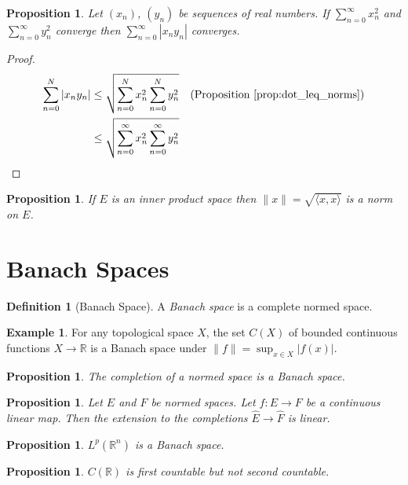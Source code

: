\documentclass{book}
\let\qed\relax
\newtheorem{prop}[ax]{Proposition}
\theoremstyle{definition}
\newtheorem{df}[ax]{Definition}
\newtheorem{ex}[ax]{Example}
\begin{document}
\begin{prop}
Let $(x_n)$, $(y_n)$ be sequences of real numbers. If $\sum_{n=0}^\infty x_n^2$ and $\sum_{n=0}^\infty y_n^2$ converge then $\sum_{n=0}^\infty |x_n y_n|$ converges.
\end{prop}

\begin{proof}
\pf
\begin{align*}
\sum_{n=0}^N |x_n y_n| & \leq \sqrt{\sum_{n=0}^N x_n^2 \sum_{n=0}^N y_n^2} & (\text{Proposition \ref{prop:dot_leq_norms}}) \\
& \leq \sqrt{\sum_{n=0}^\infty x_n^2 \sum_{n=0}^\infty y_n^2} & \qed
\end{align*}
\end{proof}


\begin{prop}
If $E$ is an inner product space then $\| x \| = \sqrt{\langle x,x \rangle}$ is a norm on $E$.
\end{prop}

\section{Banach Spaces}

\begin{df}[Banach Space]
A \emph{Banach space} is a complete normed space.
\end{df}

\begin{ex}
For any topological space $X$, the set $C(X)$ of bounded continuous functions $X \rightarrow \mathbb{R}$ is a Banach space under $\| f \| = \sup_{x \in X} |f(x)|$.
\end{ex}

\begin{prop}
The completion of a normed space is a Banach space.
\end{prop}

\begin{prop}
Let $E$ and $F$ be normed spaces. Let $f : E \rightarrow F$ be a continuous linear map. Then the extension to the completions $\hat{E} \rightarrow \hat{F}$ is linear.
\end{prop}

\begin{prop}
$L^p(\mathbb{R}^n)$ is a Banach space.
\end{prop}

\begin{prop}
$C(\mathbb{R})$ is first countable but not second countable.
\end{prop}
\end{document}
